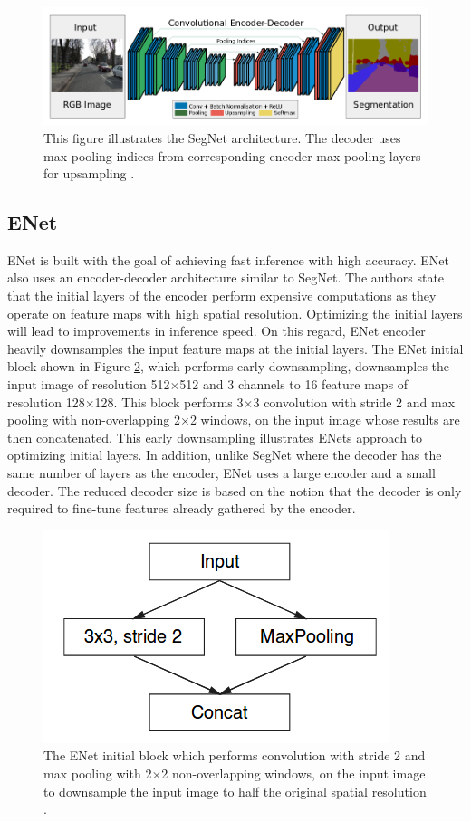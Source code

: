 	\begin{figure}[h]
		\centering
		\includegraphics[width=1\linewidth]{images/segnet}
		\caption{This figure illustrates the SegNet architecture. The decoder uses max pooling indices from corresponding encoder max pooling layers for upsampling \cite{DBLP:journals/corr/BadrinarayananK15}.}
		\label{Fig:segnet}
	\end{figure}

\subsection{ENet}

ENet \cite{DBLP:journals/corr/PaszkeCKC16} is built with the goal of achieving fast inference with high accuracy. ENet also uses an encoder-decoder architecture similar to SegNet. The authors state that the initial layers of the encoder perform expensive computations as they operate on feature maps with high spatial resolution. Optimizing the initial layers will lead to improvements in inference speed. On this regard, ENet encoder heavily downsamples the input feature maps at the initial layers. The ENet initial block shown in Figure \ref{Fig:enet}, which performs early downsampling, downsamples the input image of resolution 512$\times$512 and 3 channels to 16 feature maps of resolution 128$\times$128. This block performs 3$\times$3 convolution with stride 2 and max pooling with non-overlapping 2$\times$2 windows, on the input image whose results are then concatenated. This early downsampling illustrates ENets approach to optimizing initial layers. In addition, unlike SegNet where the decoder has the same number of layers as the encoder, ENet uses a large encoder and a small decoder. The reduced decoder size is based on the notion that the decoder is only required to fine-tune features already gathered by the encoder. 

	\begin{figure}[h]
		\centering
		\includegraphics[width=.4\linewidth]{images/enet}
		\caption{The ENet initial block which performs convolution with stride 2 and max pooling with 2$\times$2 non-overlapping windows, on the input image to downsample the input image to half the original spatial resolution \cite{DBLP:journals/corr/PaszkeCKC16}.}
		\label{Fig:enet}
	\end{figure}

